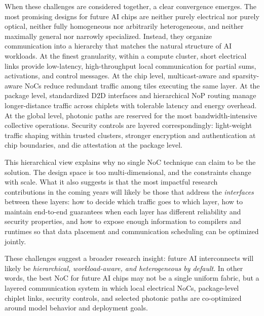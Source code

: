 When these challenges are considered together, a clear convergence emerges. The most promising designs for future AI chips are neither purely electrical nor purely optical, neither fully homogeneous nor arbitrarily heterogeneous, and neither maximally general nor narrowly specialized. Instead, they organize communication into a hierarchy that matches the natural structure of AI workloads. At the finest granularity, within a compute cluster, short electrical links provide low-latency, high-throughput local communication for partial sums, activations, and control messages. At the chip level, multicast-aware and sparsity-aware NoCs reduce redundant traffic among tiles executing the same layer. At the package level, standardized D2D interfaces and hierarchical NoP routing manage longer-distance traffic across chiplets with tolerable latency and energy overhead. At the global level, photonic paths are reserved for the most bandwidth-intensive collective operations. Security controls are layered correspondingly: light-weight traffic shaping within trusted clusters, stronger encryption and authentication at chip boundaries, and die attestation at the package level.

This hierarchical view explains why no single NoC technique can claim to be the solution. The design space is too multi-dimensional, and the constraints change with scale. What it also suggests is that the most impactful research contributions in the coming years will likely be those that address the \emph{interfaces} between these layers: how to decide which traffic goes to which layer, how to maintain end-to-end guarantees when each layer has different reliability and security properties, and how to expose enough information to compilers and runtimes so that data placement and communication scheduling can be optimized jointly.

These challenges suggest a broader research insight: future AI interconnects will likely be \emph{hierarchical, workload-aware, and heterogeneous by default}. In other words, the best NoC for future AI chips may not be a single uniform fabric, but a layered communication system in which local electrical NoCs, package-level chiplet links, security controls, and selected photonic paths are co-optimized around model behavior and deployment goals.
